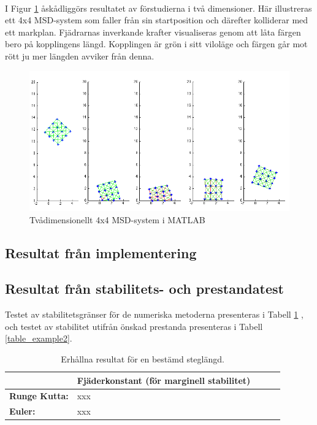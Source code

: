 \documentclass[a4paper,12pt,oneside,final,swedish]{extarticle}
\begin{document}
\noindent \\I Figur \ref{tvådim} åskådliggörs resultatet av förstudierna i två dimensioner. Här illustreras ett 4x4 MSD-system som faller från sin startposition och därefter kolliderar med ett markplan.
Fjädrarnas inverkande krafter visualiseras genom att låta färgen bero på kopplingens längd. 
Kopplingen är grön i sitt viloläge och färgen går mot rött ju mer längden avviker från denna.

\begin{figure}[h!]
  \begin{center}
    \includegraphics[width=16cm]{Bilder/boing.png} 
  \end{center}
  \caption{Tvådimensionellt 4x4 MSD-system i MATLAB}
  \label{tvådim}
\end{figure}

\subsection{Resultat från implementering}
\subsection{Resultat från stabilitets- och prestandatest}
Testet av stabilitetsgränser för de numeriska metoderna presenteras i Tabell \ref{table_example1} , och testet av stabilitet utifrån önskad prestanda presenteras i Tabell \ref{table_example2}.
\begin{table}[htbp]
    \caption{Erhållna resultat för en bestämd steglängd.}
    \label{table_example1}
    \begin{tabular*}{\hsize}{lllll}
      \hline %
       & \bfseries Fjäderkonstant (för marginell stabilitet)\\
      \hline
      \bfseries Runge Kutta: & xxx\\
      \bfseries Euler: & xxx\\
      \hline
    \end{tabular*}
\end{table}
\end{document}
